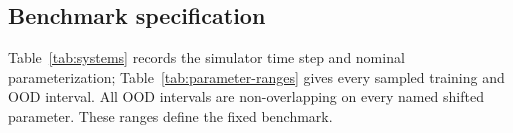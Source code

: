\documentclass[pdflatex,sn-basic]{sn-jnl}
\begin{document}
\begin{appendices}
\renewcommand{\theHtable}{appendix.\arabic{table}}
\renewcommand{\theHfigure}{appendix.\arabic{figure}}
\renewcommand{\theHequation}{appendix.\arabic{equation}}
\section{Benchmark specification}

Table~\ref{tab:systems} records the simulator time step and nominal
parameterization; Table~\ref{tab:parameter-ranges} gives every sampled training
and OOD interval. All OOD intervals are non-overlapping on every named shifted
parameter. These ranges define the fixed benchmark.

\begin{table}[ht]
\centering
\caption{Controlled-system definitions. $u$ is scalar in every system.}
\label{tab:systems}
\end{table}


\end{appendices}
\end{document}
